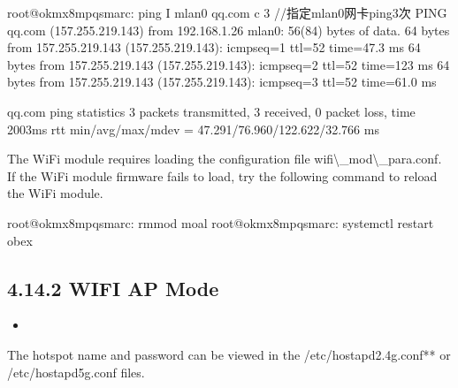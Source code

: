 \documentclass[letterpaper,10pt,openany,english]{sphinxmanual}
\begin{document}
\begin{sphinxVerbatim}[commandchars=\\\{\}]
root@ok\PYGZhy{}mx8mpq\PYGZhy{}smarc:\PYGZti{}\PYGZsh{} ping \PYGZhy{}I mlan0 qq.com \PYGZhy{}c 3    //指定mlan0网卡ping3次
PING qq.com (157.255.219.143) from 192.168.1.26 mlan0: 56(84) bytes of data.
64 bytes from 157.255.219.143 (157.255.219.143): icmp\PYGZus{}seq=1 ttl=52 time=47.3 ms
64 bytes from 157.255.219.143 (157.255.219.143): icmp\PYGZus{}seq=2 ttl=52 time=123 ms
64 bytes from 157.255.219.143 (157.255.219.143): icmp\PYGZus{}seq=3 ttl=52 time=61.0 ms

\PYGZhy{}\PYGZhy{}\PYGZhy{} qq.com ping statistics \PYGZhy{}\PYGZhy{}
3 packets transmitted, 3 received, 0\PYGZpc{} packet loss, time 2003ms
rtt min/avg/max/mdev = 47.291/76.960/122.622/32.766 ms
\end{sphinxVerbatim}

\sphinxAtStartPar
The WiFi module requires loading the configuration file wifi\textbackslash{}\_mod\textbackslash{}\_para.conf. If the WiFi module firmware fails to load, try the following command to reload the WiFi module.

\begin{sphinxVerbatim}[commandchars=\\\{\}]
root@ok\PYGZhy{}mx8mpq\PYGZhy{}smarc:\PYGZti{}\PYGZsh{} rmmod moal
root@ok\PYGZhy{}mx8mpq\PYGZhy{}smarc:\PYGZti{}\PYGZsh{} systemctl  restart obex
\end{sphinxVerbatim}


\subsection{4.14.2 WIFI AP Mode}
\label{\detokenize{linux-manual:wifi-ap-mode}}
\sphinxAtStartPar
{}
\begin{itemize}
\item {} 
\sphinxAtStartPar
{}

\end{itemize}

\sphinxAtStartPar
The hotspot name and password can be viewed in the /etc/hostapd\sphinxhyphen{}2.4g.conf** or /etc/hostapd\sphinxhyphen{}5g.conf files.
\end{document}
